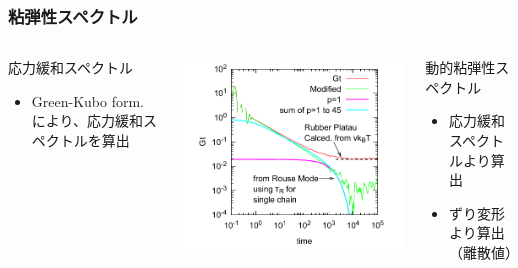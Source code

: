 \documentclass[11pt, dvipdfmx]{beamer}
\begin{document}
\begin{frame}
\frametitle{粘弾性スペクトル}

\begin{columns}[totalwidth=1\textwidth]

\begin{block}{応力緩和スペクトル}
\begin{itemize}
\small
\item
Green-Kubo form. により、応力緩和スペクトルを算出
\end{itemize}

\end{block}

\centering
\includegraphics[width=\columnwidth]{./fig/Gt_loglog.pdf}


\begin{exampleblock}{動的粘弾性スペクトル}
\begin{itemize}
\small
\item
応力緩和スペクトルより算出
\item
ずり変形より算出（離散値）
\end{itemize}
\end{exampleblock}


\end{columns}
\end{frame}
\end{document}
